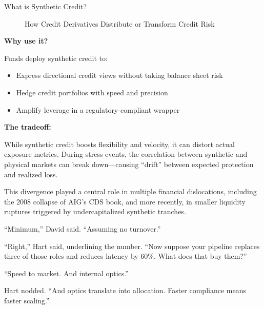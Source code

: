 \begin{TechnicalSidebar}{What is Synthetic Credit?}
\begin{figure}[H]
{\begin{tikzpicture}
  
      \end{tikzpicture}%
    }
    \caption{How Credit Derivatives Distribute or Transform Credit Risk}
  \end{figure}

  \medskip
  
  \textbf{Why use it?}  

  \medskip

  Funds deploy synthetic credit to:

  \medskip
  
  \begin{itemize}
    \item Express directional credit views without taking balance sheet risk
    \item Hedge credit portfolios with speed and precision
    \item Amplify leverage in a regulatory-compliant wrapper
  \end{itemize}

  \medskip
  
  \textbf{The tradeoff:}  
  
  \medskip

  While synthetic credit boosts flexibility and velocity, it can distort actual exposure metrics. During stress events, 
  the correlation between synthetic and physical markets can break down—causing ``drift'' between expected protection 
  and realized loss.

  \medskip
  
  This divergence played a central role in multiple financial dislocations, including the 2008 collapse of AIG’s CDS 
  book, and more recently, in smaller liquidity ruptures triggered by undercapitalized synthetic tranches.
  
\end{TechnicalSidebar}

\medskip

``Minimum,'' David said. ``Assuming no turnover.''

``Right,'' Hart said, underlining the number. ``Now suppose your pipeline replaces three of those roles 
and reduces latency by 60\%. What does that buy them?''

``Speed to market. And internal optics.''

Hart nodded. ``And optics translate into allocation. Faster compliance means faster scaling.''

